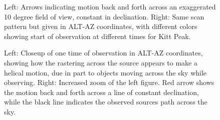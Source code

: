 \documentclass[manuscript]{aastex}
\begin{document}
\begin{figure}[H]%
    \centering
    \qquad
    \singlespace
    \caption[TIME Scan Strategy 1]{Left: Arrows indicating motion back and forth across an exaggerated 10 degree field of view, constant in declination. Right: Same scan pattern but given in ALT-AZ coordinates, with different colors showing start of observation at different times for Kitt Peak.}%
    \label{fig:time2ab}%
\end{figure}

\begin{figure}[H]%
    \centering
    \qquad
    \singlespace
    \caption[TIME Scan Strategy 2]{Left: Closeup of one time of observation in ALT-AZ coordinates, showing how the rastering across the source appears to make a helical motion, due in part to objects moving across the sky while observing. Right: Increased zoom of the left figure. Red arrow shows the motion back and forth across a line of constant declination, while the black line indicates the observed sources path across the sky.}%
    \label{fig:time2cd}%
\end{figure}
\end{document}
